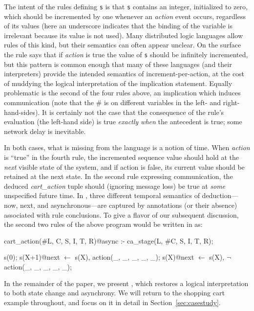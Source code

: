 The intent of the rules defining {\tt s} is that {\tt s} contains an integer, initialized to
zero, which should be incremented by one whenever an {\em action} event occurs,
regardless of its values (here an underscore indicates that the binding of the variable
is irrelevant because its value is not used).  
Many distributed logic languages allow rules of this kind,
but their semantics can often appear unclear.  On the surface the rule says that if {\em action} is true
the value of {\tt s} should be infinitely incremented, but this pattern is common enough
that many of these languages (and their interpreters) provide the intended semantics of increment-per-action, at the cost of muddying the logical
interpretation of the implication statement.  Equally problematic is the second of the four rules above,
an implication which induces communication (note that the \# is on different variables in the left- and right-hand-sides).  It is certainly not the case that the consequence of the rule's evaluation (the left-hand side) is true {\em exactly when} the antecedent is
true; some network delay is inevitable.

In both cases, what is missing from the language is a notion of time.  When {\em action} is ``true'' in the fourth rule,
the incremented sequence value should
hold at the {\em next} visible state of the system, and if action is false, its current
value should be retained at the next state.  In the second rule expressing communication, 
the deduced {\em cart\_action}
tuple should (ignoring message loss) be true at {\em some} unspecified future time.  In \lang,
three different temporal semantics of deduction---now, next, and asynchronous---are captured by annotations (or their absence) 
associated with rule conclusions.  To give a flavor of our subsequent discussion, the second two rules of the above program would be written in \lang as:

\begin{Dedalus}
cart_action(#L, C, S, I, T, R)@async :-
  ca_stage(L, #C, S, I, T, R);

s(0);
s(X+1)@next \(\leftarrow\)  s(X), action(_, _, _, _, _);
s(X)@next \(\leftarrow\)  s(X), \(\lnot\) action(_, _, _, _, _);
\end{Dedalus}

In the remainder of the paper, we present \lang, which restores a logical interpretation to
both state change and asynchrony.  We will return to the shopping cart example throughout, and focus on it in detail 
in Section~\ref{sec:casestudy}.

